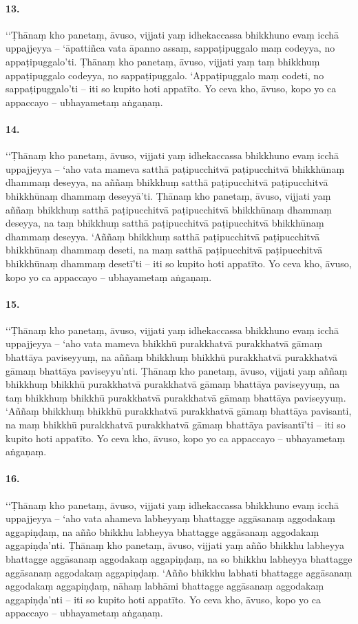 \paragraph{13.} ‘‘Ṭhānaṃ kho panetaṃ, āvuso, vijjati yaṃ idhekaccassa bhikkhuno evaṃ icchā uppajjeyya – ‘āpattiñca vata āpanno assaṃ, sappaṭipuggalo maṃ codeyya, no appaṭipuggalo’ti. Ṭhānaṃ kho panetaṃ, āvuso, vijjati yaṃ taṃ bhikkhuṃ appaṭipuggalo codeyya, no sappaṭipuggalo. ‘Appaṭipuggalo maṃ codeti, no sappaṭipuggalo’ti – iti so kupito hoti appatīto. Yo ceva kho, āvuso, kopo yo ca appaccayo – ubhayametaṃ aṅgaṇaṃ.

\paragraph{14.} ‘‘Ṭhānaṃ kho panetaṃ, āvuso, vijjati yaṃ idhekaccassa bhikkhuno evaṃ icchā uppajjeyya – ‘aho vata mameva satthā paṭipucchitvā paṭipucchitvā bhikkhūnaṃ dhammaṃ deseyya, na aññaṃ bhikkhuṃ satthā paṭipucchitvā paṭipucchitvā bhikkhūnaṃ dhammaṃ deseyyā’ti. Ṭhānaṃ kho panetaṃ, āvuso, vijjati yaṃ aññaṃ bhikkhuṃ satthā paṭipucchitvā paṭipucchitvā bhikkhūnaṃ dhammaṃ deseyya, na taṃ bhikkhuṃ satthā paṭipucchitvā paṭipucchitvā bhikkhūnaṃ dhammaṃ deseyya. ‘Aññaṃ bhikkhuṃ satthā paṭipucchitvā paṭipucchitvā bhikkhūnaṃ dhammaṃ deseti, na maṃ satthā paṭipucchitvā paṭipucchitvā bhikkhūnaṃ dhammaṃ desetī’ti – iti so kupito hoti appatīto. Yo ceva kho, āvuso, kopo yo ca appaccayo – ubhayametaṃ aṅgaṇaṃ.

\paragraph{15.} ‘‘Ṭhānaṃ kho panetaṃ, āvuso, vijjati yaṃ idhekaccassa bhikkhuno evaṃ icchā uppajjeyya – ‘aho vata mameva bhikkhū purakkhatvā purakkhatvā gāmaṃ bhattāya paviseyyuṃ, na aññaṃ bhikkhuṃ bhikkhū purakkhatvā purakkhatvā gāmaṃ bhattāya paviseyyu’nti. Ṭhānaṃ kho panetaṃ, āvuso, vijjati yaṃ aññaṃ bhikkhuṃ bhikkhū purakkhatvā purakkhatvā gāmaṃ bhattāya paviseyyuṃ, na taṃ bhikkhuṃ bhikkhū purakkhatvā purakkhatvā gāmaṃ bhattāya paviseyyuṃ. ‘Aññaṃ bhikkhuṃ bhikkhū purakkhatvā purakkhatvā gāmaṃ bhattāya pavisanti, na maṃ bhikkhū purakkhatvā purakkhatvā gāmaṃ bhattāya pavisantī’ti – iti so kupito hoti appatīto. Yo ceva kho, āvuso, kopo yo ca appaccayo – ubhayametaṃ aṅgaṇaṃ.

\paragraph{16.} ‘‘Ṭhānaṃ kho panetaṃ, āvuso, vijjati yaṃ idhekaccassa bhikkhuno evaṃ icchā uppajjeyya – ‘aho vata ahameva labheyyaṃ bhattagge aggāsanaṃ aggodakaṃ aggapiṇḍaṃ, na añño bhikkhu labheyya bhattagge aggāsanaṃ aggodakaṃ aggapiṇḍa’nti. Ṭhānaṃ kho panetaṃ, āvuso, vijjati yaṃ añño bhikkhu labheyya bhattagge aggāsanaṃ aggodakaṃ aggapiṇḍaṃ, na so bhikkhu labheyya bhattagge aggāsanaṃ aggodakaṃ aggapiṇḍaṃ. ‘Añño bhikkhu labhati bhattagge aggāsanaṃ aggodakaṃ aggapiṇḍaṃ, nāhaṃ labhāmi bhattagge aggāsanaṃ aggodakaṃ aggapiṇḍa’nti – iti so kupito hoti appatīto. Yo ceva kho, āvuso, kopo yo ca appaccayo – ubhayametaṃ aṅgaṇaṃ.

